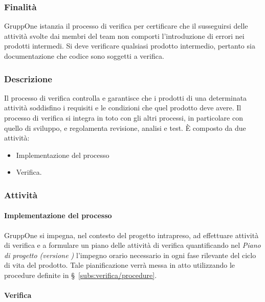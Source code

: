 \documentclass[../../norme-di-progetto.tex]{subfiles}
\begin{document}
\subsubsection{Finalità}%
\label{subs:verifica/finalita}

GruppOne istanzia il processo di verifica per certificare che il susseguirsi delle attività svolte dai membri del team non comporti l'introduzione di errori nei prodotti intermedi.
Si deve verificare qualsiasi prodotto intermedio, pertanto sia documentazione che codice sono soggetti a verifica.

\subsubsection{Descrizione}%
\label{subs:verifica/descrizione}

Il processo di verifica controlla e garantisce che i prodotti di una determinata attività soddisfino i requisiti e le condizioni che quel prodotto deve avere. Il processo di verifica si integra in toto con gli altri processi, in particolare con quello di sviluppo, e regolamenta revisione, analisi e test. È composto da due attività:

\begin{itemize}
  \item Implementazione del processo
  \item Verifica.
\end{itemize}

\subsubsection{Attività}%
\label{subs:verifica/attivita}

\paragraph{Implementazione del processo}%
\label{par:implementazione_di_processo}

GruppOne si impegna, nel contesto del progetto intrapreso, ad effettuare attività di verifica e a formulare un piano delle attività di verifica quantificando nel \textit{Piano di progetto (versione \versione)} l'impegno orario necessario in ogni fase rilevante del ciclo di vita del prodotto. Tale pianificazione verrà messa in atto utilizzando le procedure definite in §~\ref{subs:verifica/procedure}.


\paragraph{Verifica}%
\label{par:verifica}
\end{document}
